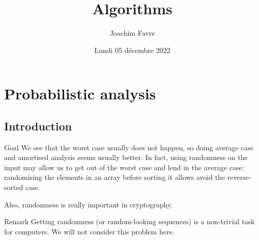 \documentclass[a4paper]{article}
\title{Algorithms}
\author{Joachim Favre}
\date{Lundi 05 décembre 2022}
\begin{document}
\maketitle


\section{Probabilistic analysis}
\subsection{Introduction}
\begin{parag}{Goal}
    We see that the worst case usually does not happen, so doing average case and amortised analysis seems usually better. In fact, using randomness on the input may allow us to get out of the worst case and lend in the average case: randomising the elements in an array before sorting it allows avoid the reverse-sorted case.

    Also, randomness is really important in cryptography.

    \begin{subparag}{Remark}
        Getting randomness (or random-looking sequences) is a non-trivial task for computers. We will not consider this problem here.
    \end{subparag}
\end{parag}
\end{document}
